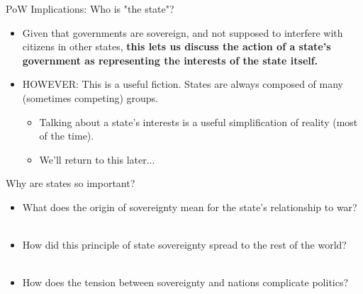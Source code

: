 \documentclass{beamer}
\begin{document}
\begin{frame}{\LARGE PoW Implications: Who is "the state"?}
	\begin{itemize}
		\item Given that governments are sovereign, and not supposed to interfere with citizens in other states, \textbf{this lets us discuss the action of a state’s government as representing the interests of the state itself.} \pause
		\item HOWEVER: This is a useful fiction. States are always composed of many (sometimes competing) groups.
		\begin{itemize}
			\item Talking about a state's interests is a useful simplification of reality (most of the time).
			\item We'll return to this later...
		\end{itemize}
	\end{itemize}
\end{frame}


\begin{frame}{\LARGE Why are states so important?}
\begin{itemize}
     \item What does the origin of sovereignty mean for the state's relationship to war? 
    \\~\\
    \item How did this principle of state sovereignty spread to the rest of the world?
    \\~\\
    \item How does the tension between sovereignty and nations complicate politics?
\end{itemize}
\end{frame}
\end{document}
